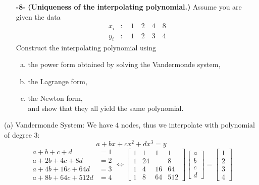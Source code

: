 \documentclass[11pt]{article}
\theoremstyle{definition}
\newcommand{\1}[1]{\mathbf{1} \left \{ #1 \right \}}
\begin{document}
\begin{itemize}
    \item[{\textbf{-8-}}] \textbf{(Uniqueness of the interpolating polynomial.)}  Assume you are given the data
    \begin{equation}
        \begin{split}
            x_i &:\quad 1\quad 2\quad 4\quad 8 \\
            y_i &:\quad 1\quad 2\quad 3\quad 4
        \end{split}
    \end{equation}
    Construct the interpolating polynomial using
    \begin{enumerate}[a.]
        \item the power form obtained by solving the Vandermonde system,
        \item the Lagrange form,
        \item the Newton form,\\
        and show that they all yield the same polynomial.
    \end{enumerate}
\end{itemize}
(a) Vandermonde System: We have $4$ nodes, thus we interpolate with polynomial of degree 3:
\[a + bx + cx^2 + dx^3 = y\]
\begin{equation*}
    \begin{split}
    a + b + c + d &= 1 \\
    a + 2b + 4c + 8d &= 2 \\
    a + 4b + 16c + 64d &= 3 \\
    a + 8b + 64c + 512d &= 4
    \end{split}
    \Longleftrightarrow \begin{bmatrix}
    1 & 1 & 1 & 1 \\
    1 & 2 4 & & 8 \\
    1 & 4 & 16 & 64 \\
    1 & 8 & 64 & 512
    \end{bmatrix} \begin{bmatrix}
    a \\ b \\ c \\ d
    \end{bmatrix} = \begin{bmatrix}
    1 \\ 2 \\ 3 \\ 4 \end{bmatrix}
\end{equation*}
\end{document}
